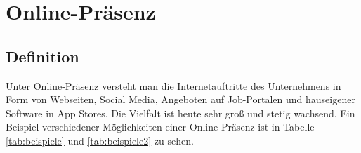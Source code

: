 \tableofcontents
\newpage

\section{Online-Präsenz}

\subsection{Definition}

Unter Online-Präsenz versteht man die Internetauftritte des Unternehmens in Form von Webseiten, Social Media, Angeboten auf Job-Portalen und hauseigener Software in App Stores. Die Vielfalt ist heute sehr groß und stetig wachsend. Ein Beispiel verschiedener Möglichkeiten einer Online-Präsenz ist in Tabelle \ref{tab:beispiele} und \ref{tab:beispiele2} zu sehen. %

